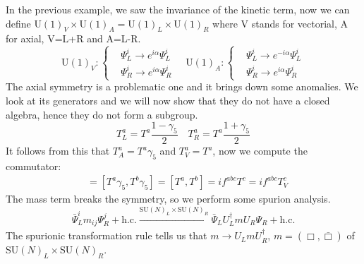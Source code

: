 \documentclass[../main.tex]{subfiles}
\begin{document}
In the previous example, we saw the invariance of the kinetic term, now we can define U$(1)_V\times$U$(1)_A=$U$(1)_L\times$U$(1)_R$ where V stands for vectorial, A for axial, V=L+R and A=L-R. 
\[
\text{U}(1)_V:
\left\{
\begin{aligned}
&\Psi_L^i\to e^{i\alpha}\Psi_L^i\\
&\Psi_R^i\to e^{i\alpha}\Psi_R^i
\end{aligned}
\right.
\quad
\text{U}(1)_A:
\left\{
\begin{aligned}
&\Psi_L^i\to e^{-i\alpha}\Psi_L^i\\
&\Psi_R^i\to e^{i\alpha}\Psi_R^i
\end{aligned}
\right.
\]
The axial symmetry is a problematic one and it brings down some anomalies. We look at its generators and we will now show that they do not have a closed algebra, hence they do not form a subgroup. 
\[
T_L^a=T^a\frac{1-\gamma_5}{2} \quad T_R^a=T^a\frac{1+\gamma_5}{2}
\]
It follows from this that $T_A^a=T^a\gamma_5$ and $T_V^a=T^a$, now we compute the commutator:
\begin{align*}
[T_A^a,T_A^b]&=[T^a\gamma_5,T^b\gamma_5]=[T^a,T^b]=if^{abc}T^c=if^{abc}T_V^c
\end{align*}
The mass term breaks the symmetry, so we perform some spurion analysis.
\[
\bar{\Psi}_L^im_{ij}\Psi_R^j+\text{h.c.}\xrightarrow[]{\text{SU}(N)_L\times\text{SU}(N)_R}\bar{\Psi}_LU^\dagger_LmU_R\Psi_R+\text{h.c.}
\]
The spurionic transformation rule tells us that $m\to U_LmU^\dagger_R$, $m=(\Box,\bar{\Box})$ of SU$(N)_L\times$SU$(N)_R$.
\end{document}
